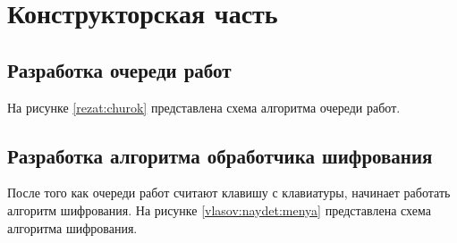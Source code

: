 \section{\large Конструкторская часть}

\subsection{Разработка очереди работ}

На рисунке \ref{rezat:churok} представлена схема алгоритма очереди работ.

\begin{figure}[ht!]
\end{figure}

\subsection{Разработка алгоритма обработчика шифрования}

После того как очереди работ считают клавишу с клавиатуры, начинает работать алгоритм шифрования.
На рисунке \ref{vlasov:naydet:menya} представлена схема алгоритма шифрования.


